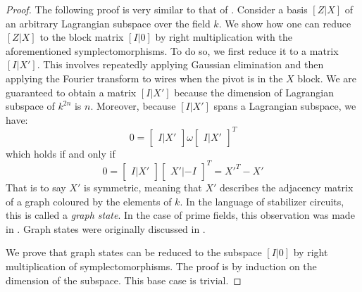 \begin{proof}
The following proof is very similar to that of  \cite[Lemma 6]{aaronson}.
Consider a basis $[Z|X]$ of an arbitrary Lagrangian subspace over the field $k$.
%
We show how one can reduce $[Z|X]$ to the block matrix $[I|0]$ by right multiplication with the aforementioned symplectomorphisms.
To do so, we first reduce it to a matrix $[I|X']$.
This involves repeatedly applying Gaussian elimination and then applying the Fourier transform to wires when the pivot is in the $X$ block.
We are guaranteed to obtain a matrix $[I|X']$ because the dimension of Lagrangian subspace of $k^{2n}$ is $n$. Moreover, because  $[I|X']$ spans a Lagrangian subspace, we have: 
$$
0
=
\begin{bmatrix}
I | X'
\end{bmatrix}
\omega
\begin{bmatrix}
I | X'
\end{bmatrix}^T
$$
which holds if and only if 
$$
0=
\begin{bmatrix}
I | X'
\end{bmatrix}
\begin{bmatrix}
X' | -I 
\end{bmatrix}^T
=
{X'}^T-X'
$$
That is to say $X'$ is symmetric, meaning that $X'$ describes the adjacency matrix of a graph coloured by the elements of $k$.
In the language of stabilizer circuits, this is called a {\em graph state}.  In the case of prime fields, this observation was made in \cite[Equation 18]{gross}.  Graph states were originally discussed in \cite{hein2006entanglement}.

We prove that graph states can be reduced to the subspace $[I|0]$ by right multiplication of  symplectomorphisms.
The proof is by induction on the dimension of the subspace.
This base case is trivial.


\end{proof}
